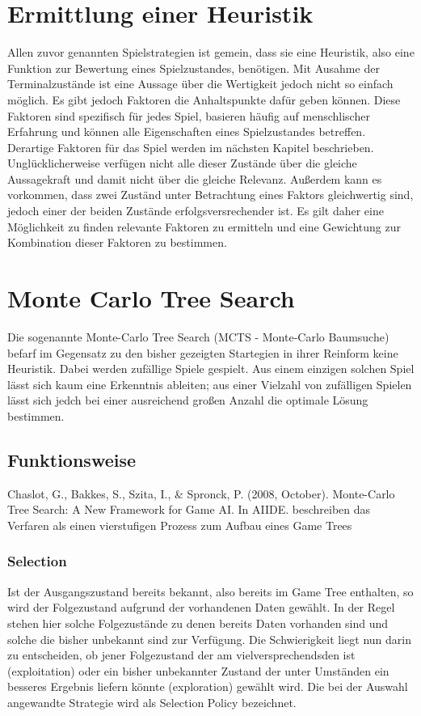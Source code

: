 \section{Ermittlung einer Heuristik}
Allen zuvor genannten Spielstrategien ist gemein, dass sie eine Heuristik, also eine Funktion zur Bewertung eines Spielzustandes, benötigen. Mit Ausahme der Terminalzustände ist eine Aussage über die Wertigkeit jedoch nicht so einfach möglich. Es gibt jedoch Faktoren die Anhaltspunkte dafür geben können. Diese Faktoren sind spezifisch für jedes Spiel, basieren häufig auf menschlischer Erfahrung und können alle Eigenschaften eines Spielzustandes betreffen. Derartige Faktoren für das Spiel werden im nächsten Kapitel beschrieben.\\
Unglücklicherweise verfügen nicht alle dieser Zustände über die gleiche Aussagekraft und damit nicht über die gleiche Relevanz. Außerdem kann es vorkommen, dass zwei Zuständ unter Betrachtung eines Faktors gleichwertig sind, jedoch einer der beiden Zustände erfolgsversrechender ist. Es gilt daher eine Möglichkeit zu finden relevante Faktoren zu ermitteln und eine Gewichtung zur Kombination dieser Faktoren zu bestimmen.\\

\section{Monte Carlo Tree Search}
Die sogenannte Monte-Carlo Tree Search (MCTS - Monte-Carlo Baumsuche) befarf im Gegensatz zu den bisher gezeigten Startegien in ihrer Reinform keine Heuristik. Dabei werden zufällige Spiele gespielt. Aus einem einzigen solchen Spiel lässt sich kaum eine Erkenntnis ableiten; aus einer Vielzahl von zufälligen Spielen lässt sich jedch bei einer ausreichend großen Anzahl die optimale Lösung bestimmen.
\subsection{Funktionsweise}
{Chaslot, G., Bakkes, S., Szita, I., & Spronck, P. (2008, October). Monte-Carlo Tree Search: A New Framework for Game AI. In AIIDE.} beschreiben das Verfaren als einen vierstufigen Prozess zum Aufbau eines Game Trees
\subsubsection{Selection}
Ist der Ausgangszustand bereits bekannt, also bereits im Game Tree enthalten, so wird der Folgezustand aufgrund der vorhandenen Daten gewählt. In der Regel stehen hier solche Folgezustände zu denen bereits Daten vorhanden sind und solche die bisher unbekannt sind zur Verfügung. Die Schwierigkeit liegt nun darin zu entscheiden, ob jener Folgezustand der am vielversprechendsden ist (exploitation) oder ein bisher unbekannter Zustand der unter Umständen ein besseres Ergebnis liefern könnte (exploration) gewählt wird. Die bei der Auswahl angewandte Strategie wird als Selection Policy bezeichnet.
